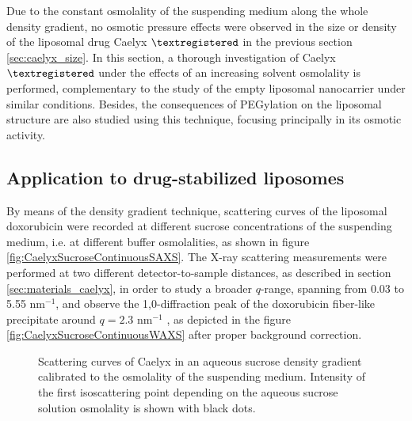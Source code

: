 Due to the constant osmolality of the suspending medium along the whole density gradient, no osmotic pressure effects were observed in the size or density of the liposomal drug Caelyx $\textregistered$ in the previous section \ref{sec:caelyx_size}. In this section, a thorough investigation of Caelyx $\textregistered$ under the effects of an increasing solvent osmolality is performed, complementary to the study of the empty liposomal nanocarrier under similar conditions. Besides, the consequences of PEGylation on the liposomal structure are also studied using this technique, focusing principally in its osmotic activity.
 
\subsection{Application to drug-stabilized liposomes}
\label{sec:OsmoticCaelyx}

By means of the density gradient technique, scattering curves of the liposomal doxorubicin were recorded at different sucrose concentrations of the suspending medium, i.e. at different buffer osmolalities, as shown in figure \ref{fig:CaelyxSucroseContinuousSAXS}. The X-ray scattering measurements were performed at two different detector-to-sample distances, as described in section \ref{sec:materials_caelyx}, in order to study a broader $q$-range, spanning from 0.03 to 5.55 nm$^{-1}$, and observe the 1,0-diffraction peak of the doxorubicin fiber-like precipitate around $q=2.3$ nm$^{-1}$ \cite{li_doxorubicin_1998}, as depicted in the figure \ref{fig:CaelyxSucroseContinuousWAXS} after proper background correction.

\begin{figure}
	\centering
		\caption{Scattering curves of Caelyx in an aqueous sucrose density gradient calibrated to the osmolality of the suspending medium. Intensity of the first isoscattering point depending on the aqueous sucrose solution osmolality is shown with black dots.}
\end{figure}

